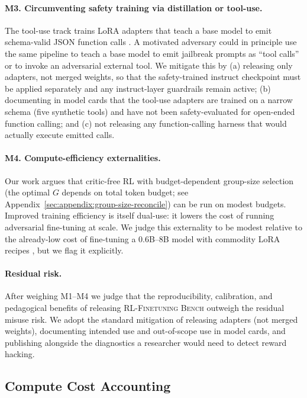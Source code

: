 \documentclass{article}
\newcommand{\ours}{\textsc{RL-Finetuning Bench}}
\begin{document}
\paragraph{M3. Circumventing safety training via distillation or tool-use.}
The tool-use track trains LoRA adapters that teach a base model to emit
schema-valid JSON function calls \cite{liu2024xlam}. A motivated adversary
could in principle use the same pipeline to teach a base model to emit
jailbreak prompts as ``tool calls'' or to invoke an adversarial external
tool. We mitigate this by (a) releasing only adapters, not merged weights,
so that the safety-trained instruct checkpoint must be applied separately
and any instruct-layer guardrails remain active; (b) documenting in model
cards that the tool-use adapters are trained on a narrow schema (five
synthetic tools) and have not been safety-evaluated for open-ended function
calling; and (c) not releasing any function-calling harness that would
actually execute emitted calls.

\paragraph{M4. Compute-efficiency externalities.}
Our work argues that critic-free RL with budget-dependent group-size
selection (the optimal $G$ depends on total token budget; see
Appendix~\ref{sec:appendix:group-size-reconcile}) can be run on modest
budgets. Improved training efficiency is
itself dual-use: it lowers the cost of running adversarial fine-tuning at
scale. We judge this externality to be modest relative to the already-low
cost of fine-tuning a 0.6B--8B model with commodity LoRA recipes
\cite{hu2022lora}, but we flag it explicitly.

\paragraph{Residual risk.}
After weighing M1--M4 we judge that the reproducibility, calibration, and
pedagogical benefits of releasing \ours{} outweigh the residual misuse
risk. We adopt the standard mitigation of releasing adapters (not merged
weights), documenting intended use and out-of-scope use in model cards,
and publishing alongside the diagnostics a researcher would need to detect
reward hacking.

\subsection{Compute Cost Accounting}
\label{sec:compute_accounting}
\end{document}
